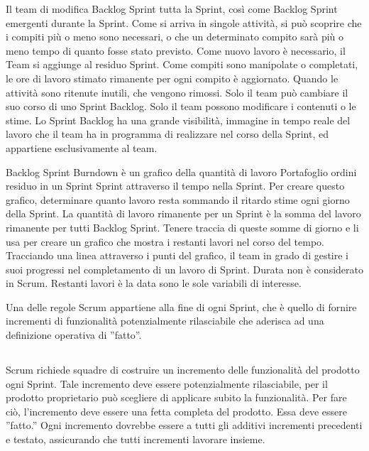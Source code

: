 
Il team di modifica Backlog Sprint tutta la Sprint, cos\`i come Backlog Sprint emergenti durante la Sprint. Come si
arriva in singole attivit\`a, si pu\`o scoprire che i compiti pi\`u o meno sono necessari, o che un determinato compito
sar\`a pi\`u o meno tempo di quanto fosse stato previsto. Come nuovo lavoro \`e necessario, il Team si aggiunge al
residuo Sprint. Come compiti sono manipolate o completati, le ore di lavoro stimato rimanente per ogni compito \`e
aggiornato. Quando le attivit\`a sono ritenute inutili, che vengono rimossi. Solo il team pu\`o cambiare il suo corso
di uno Sprint Backlog. Solo il team possono modificare i contenuti o le stime. Lo Sprint Backlog ha una grande
visibilit\`a, immagine in tempo reale del lavoro che il team ha in programma di realizzare nel corso della Sprint, ed
appartiene esclusivamente al team.\\ 
\linebreak

Backlog Sprint Burndown \`e un grafico della quantit\`a di lavoro Portafoglio ordini residuo in un Sprint Sprint
attraverso il tempo nella Sprint. Per creare questo grafico, determinare quanto lavoro resta sommando il ritardo stime
ogni giorno della Sprint. La quantit\`a di lavoro rimanente per un Sprint \`e la somma del lavoro rimanente per tutti
Backlog Sprint. Tenere traccia di queste somme di giorno e li usa per creare un grafico che mostra i restanti lavori
nel corso del tempo. Tracciando una linea attraverso i punti del grafico, il team in grado di gestire i suoi progressi
nel completamento di un lavoro di Sprint. Durata non \`e considerato in Scrum. Restanti lavori \`e la data sono le sole
variabili di interesse.\\ 
\linebreak 

Una delle regole Scrum appartiene alla fine di ogni Sprint, che \`e quello di fornire incrementi di funzionalit\`a
potenzialmente rilasciabile che aderisca ad una definizione operativa di ''fatto''.


\subsection*{\color{Blue}{FATTO}}
\label{sec:done}
Scrum richiede squadre di costruire un incremento delle funzionalit\`a del prodotto ogni Sprint. Tale incremento deve
essere potenzialmente rilasciabile, per il prodotto proprietario pu\`o scegliere di applicare subito la funzionalit\`a.
Per fare ci\`o, l'incremento deve essere una fetta completa del prodotto. Essa deve essere ''fatto.'' Ogni incremento
dovrebbe essere a tutti gli additivi incrementi precedenti e testato, assicurando che tutti incrementi lavorare
insieme.

